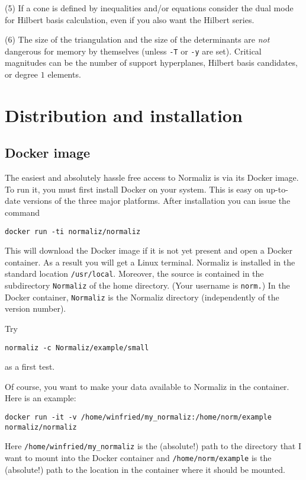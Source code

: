 \documentclass[12pt,a4paper]{scrartcl}
\theoremstyle{definition}
\def\ttt{\texttt}
\begin{document}
(5) If a cone is defined by inequalities and/or equations
consider the dual mode for Hilbert basis calculation, even if
you also want the Hilbert series.

(6) The size of the triangulation and the size of the
determinants are \emph{not} dangerous for memory by themselves
(unless \ttt{-T} or \ttt{-y} are set). Critical magnitudes can
be the number of support hyperplanes, Hilbert basis candidates,
or degree $1$ elements.


\section{Distribution and installation}\label{Distr}

\subsection{Docker image}
The easiest and absolutely hassle free access to Normaliz is via its Docker image. To run it, you must first install Docker on your system. This is easy on up-to-date versions of the three major platforms. After installation you can issue the command 
\begin{Verbatim}
docker run -ti normaliz/normaliz
\end{Verbatim}
This will download the Docker image if it is not yet present and open a Docker container. As a result you will get a Linux terminal. Normaliz is installed in the standard location \verb|/usr/local|. Moreover, the source is contained in the subdirectory \verb|Normaliz| of the home directory. (Your username is \verb|norm.|) In the Docker container, \verb|Normaliz| is the Normaliz directory (independently of the version number).

Try
\begin{Verbatim}
normaliz -c Normaliz/example/small
\end{Verbatim}
as a first test.

Of course, you want to make your data available to Normaliz in the container. Here is an example:
\begin{Verbatim}
docker run -it -v /home/winfried/my_normaliz:/home/norm/example  normaliz/normaliz
\end{Verbatim} 
Here \verb|/home/winfried/my_normaliz| is the (absolute!) path to the directory that I want to mount into the Docker container and \verb|/home/norm/example| is the (absolute!) path to the location in the container where it should be mounted.
\end{document}
